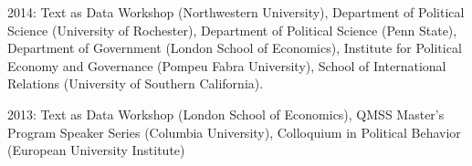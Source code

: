 \documentclass[margin,line,11pt]{resume}
\newcommand{\nl}{\vspace{0.10in}\\}
\begin{document}
\begin{resume}
2014: Text as Data Workshop (Northwestern University), Department of Political Science (University of Rochester), Department of Political Science (Penn State), Department of Government (London School of Economics), Institute for Political Economy and Governance (Pompeu Fabra University), School of International Relations (University of Southern California).

2013: Text as Data Workshop (London School of Economics), QMSS Master's Program Speaker Series (Columbia University), Colloquium in Political Behavior (European University Institute)

   
    
    

    
   
    




    

\end{resume}
\end{document}
